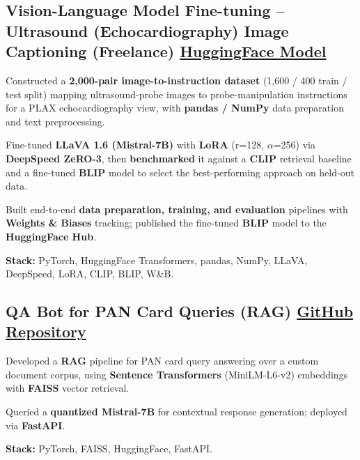 \documentclass[letter,10pt]{article}
\begin{document}
\subsection{Vision-Language Model Fine-tuning – Ultrasound (Echocardiography) Image Captioning (Freelance) \hfill \href{https://huggingface.co/sunil448832/blip-model}{HuggingFace Model}}
\begin{zitemize}
\item Constructed a \textbf{2,000-pair image-to-instruction dataset} (1,600 / 400 train / test split) mapping ultrasound-probe images to probe-manipulation instructions for a PLAX echocardiography view, with \textbf{pandas / NumPy} data preparation and text preprocessing.
\item Fine-tuned \textbf{LLaVA 1.6 (Mistral-7B)} with \textbf{LoRA} (r=128, $\alpha$=256) via \textbf{DeepSpeed ZeRO-3}, then \textbf{benchmarked} it against a \textbf{CLIP} retrieval baseline and a fine-tuned \textbf{BLIP} model to select the best-performing approach on held-out data.
\item Built end-to-end \textbf{data preparation, training, and evaluation} pipelines with \textbf{Weights \& Biases} tracking; published the fine-tuned \textbf{BLIP} model to the \textbf{HuggingFace Hub}.
\item \textbf{Stack:} PyTorch, HuggingFace Transformers, pandas, NumPy, LLaVA, DeepSpeed, LoRA, CLIP, BLIP, W\&B.
\end{zitemize}

\subsection{QA Bot for PAN Card Queries (RAG) \hfill \href{https://github.com/sunil448832/Natural-Language-Processing/tree/master/RAG(Retrieval\%20Augment\%20Generation)}{GitHub Repository}}
\begin{zitemize}
\item Developed a \textbf{RAG} pipeline for PAN card query answering over a custom document corpus, using \textbf{Sentence Transformers} (MiniLM-L6-v2) embeddings with \textbf{FAISS} vector retrieval.
\item Queried a \textbf{quantized Mistral-7B} for contextual response generation; deployed via \textbf{FastAPI}.
\item \textbf{Stack:} PyTorch, FAISS, HuggingFace, FastAPI.
\end{zitemize}
\end{document}
